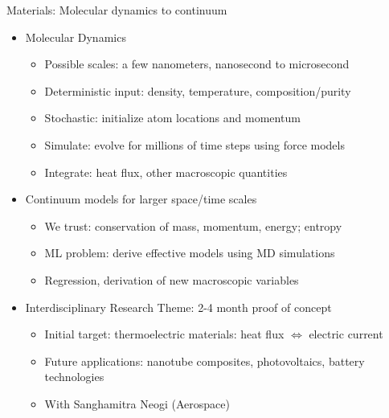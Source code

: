 \documentclass[aspectratio=169]{beamer}
\begin{document}
\begin{frame}{Materials: Molecular dynamics to continuum}
  \begin{itemize}
  \item Molecular Dynamics
    \begin{itemize}
    \item Possible scales: a few nanometers, nanosecond to microsecond
    \item Deterministic input: density, temperature, composition/purity
    \item Stochastic: initialize atom locations and momentum
    \item Simulate: evolve for millions of time steps using force models
    \item Integrate: heat flux, other macroscopic quantities
    \end{itemize}
  \item Continuum models for larger space/time scales
    \begin{itemize}
    \item We trust: conservation of mass, momentum, energy; entropy
    \item ML problem: derive effective models using MD simulations
    \item Regression, derivation of new macroscopic variables
    \end{itemize}
  \item Interdisciplinary Research Theme: 2-4 month proof of concept
    \begin{itemize}
    \item Initial target: thermoelectric materials: heat flux $\Longleftrightarrow$ electric current
    \item Future applications: nanotube composites, photovoltaics, battery technologies
    \item With Sanghamitra Neogi (Aerospace)
    \end{itemize}
  \end{itemize}
\end{frame}
\end{document}

